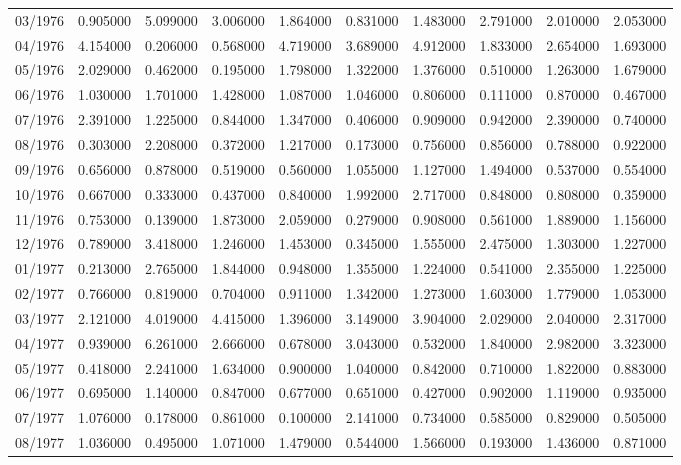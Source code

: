\begin{tabular}{lrrrrrrrrr}
03/1976 & 0.905000 & 5.099000 & 3.006000 & 1.864000 & 0.831000 & 1.483000 & 2.791000 & 2.010000 & 2.053000 \\
04/1976 & 4.154000 & 0.206000 & 0.568000 & 4.719000 & 3.689000 & 4.912000 & 1.833000 & 2.654000 & 1.693000 \\
05/1976 & 2.029000 & 0.462000 & 0.195000 & 1.798000 & 1.322000 & 1.376000 & 0.510000 & 1.263000 & 1.679000 \\
06/1976 & 1.030000 & 1.701000 & 1.428000 & 1.087000 & 1.046000 & 0.806000 & 0.111000 & 0.870000 & 0.467000 \\
07/1976 & 2.391000 & 1.225000 & 0.844000 & 1.347000 & 0.406000 & 0.909000 & 0.942000 & 2.390000 & 0.740000 \\
08/1976 & 0.303000 & 2.208000 & 0.372000 & 1.217000 & 0.173000 & 0.756000 & 0.856000 & 0.788000 & 0.922000 \\
09/1976 & 0.656000 & 0.878000 & 0.519000 & 0.560000 & 1.055000 & 1.127000 & 1.494000 & 0.537000 & 0.554000 \\
10/1976 & 0.667000 & 0.333000 & 0.437000 & 0.840000 & 1.992000 & 2.717000 & 0.848000 & 0.808000 & 0.359000 \\
11/1976 & 0.753000 & 0.139000 & 1.873000 & 2.059000 & 0.279000 & 0.908000 & 0.561000 & 1.889000 & 1.156000 \\
12/1976 & 0.789000 & 3.418000 & 1.246000 & 1.453000 & 0.345000 & 1.555000 & 2.475000 & 1.303000 & 1.227000 \\
01/1977 & 0.213000 & 2.765000 & 1.844000 & 0.948000 & 1.355000 & 1.224000 & 0.541000 & 2.355000 & 1.225000 \\
02/1977 & 0.766000 & 0.819000 & 0.704000 & 0.911000 & 1.342000 & 1.273000 & 1.603000 & 1.779000 & 1.053000 \\
03/1977 & 2.121000 & 4.019000 & 4.415000 & 1.396000 & 3.149000 & 3.904000 & 2.029000 & 2.040000 & 2.317000 \\
04/1977 & 0.939000 & 6.261000 & 2.666000 & 0.678000 & 3.043000 & 0.532000 & 1.840000 & 2.982000 & 3.323000 \\
05/1977 & 0.418000 & 2.241000 & 1.634000 & 0.900000 & 1.040000 & 0.842000 & 0.710000 & 1.822000 & 0.883000 \\
06/1977 & 0.695000 & 1.140000 & 0.847000 & 0.677000 & 0.651000 & 0.427000 & 0.902000 & 1.119000 & 0.935000 \\
07/1977 & 1.076000 & 0.178000 & 0.861000 & 0.100000 & 2.141000 & 0.734000 & 0.585000 & 0.829000 & 0.505000 \\
08/1977 & 1.036000 & 0.495000 & 1.071000 & 1.479000 & 0.544000 & 1.566000 & 0.193000 & 1.436000 & 0.871000 \\

\end{tabular}
